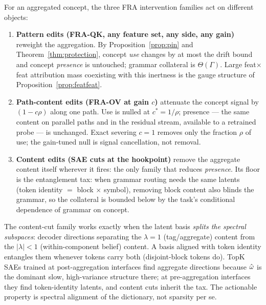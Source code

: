 \documentclass{article}
\begin{document}
\begin{corollary}\label{cor:trichotomy}
For an aggregated concept, the three FRA intervention families act on different objects:
\begin{enumerate}
    \item \textbf{Pattern edits (FRA-QK, any feature set, any side, any gain)} reweight the aggregation. By Proposition~\ref{prop:pin} and Theorem~\ref{thm:protection}, concept \emph{use} changes by at most the drift bound and concept \emph{presence} is untouched; grammar collateral is $\Theta(\Gamma)$. Large feat$\times$feat attribution mass coexisting with this inertness is the gauge structure of Proposition~\ref{prop:featfeat}.
    \item \textbf{Path-content edits (FRA-OV at gain $c$)} attenuate the concept signal by $(1 - c\rho)$ along one path. Use is nulled at $c^* = 1/\rho$; presence --- the same content on parallel paths and in the residual stream, available to a retrained probe --- is unchanged. Exact severing $c = 1$ removes only the fraction $\rho$ of use; the gain-tuned null is signal cancellation, not removal.
    \item \textbf{Content edits (SAE cuts at the hookpoint)} remove the aggregate content itself wherever it fires: the only family that reduces \emph{presence}. Its floor is the entanglement tax: when grammar routing needs the same latents (token identity $=$ block $\times$ symbol), removing block content also blinds the grammar, so the collateral is bounded below by the task's conditional dependence of grammar on concept.
\end{enumerate}
\end{corollary}

\begin{remark}\label{rem:saereq}
The content-cut family works exactly when the latent basis \emph{splits the spectral subspaces}: decoder directions separating the $\lambda = 1$ (tag/aggregate) content from the $|\lambda| < 1$ (within-component belief) content. A basis aligned with token identity entangles them whenever tokens carry both (disjoint-block tokens do). TopK SAEs trained at post-aggregation interfaces find aggregate directions because $\hat{\omega}$ is the dominant slow, high-variance structure there; at pre-aggregation interfaces they find token-identity latents, and content cuts inherit the tax. The actionable property is spectral alignment of the dictionary, not sparsity per se.
\end{remark}
\end{document}
